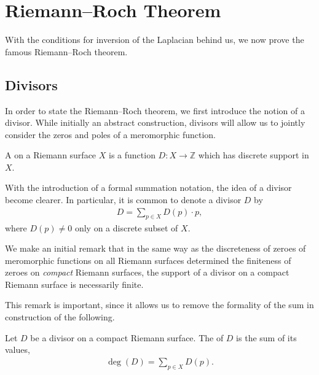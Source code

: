 \chapter{Riemann--Roch Theorem}\label{ch:riemann-roch}
\begin{chout}
	With the conditions for inversion of the Laplacian behind us, we now prove the
	famous Riemann--Roch theorem.
\end{chout}

\section{Divisors}
In order to state the Riemann--Roch theorem, we first introduce the notion of a
divisor. While initially an
abstract construction, divisors will allow us to jointly consider the zeros and
poles of a meromorphic function.

\begin{definition}[Divisor]
	A  on a Riemann surface $ X $ is a function $ D:X \to
		\mathbb{Z} $ which has discrete support in $ X $.
\end{definition}

With the introduction of a formal summation notation, the idea of a divisor
become clearer. In particular, it is common to denote a divisor $ D $ by
\begin{align*}
	D=\sum_{p \in X}^{}{D(p) \cdot p},
\end{align*}
where $ D(p) \neq 0 $ only on a discrete subset of $ X $.

\begin{remark}
	We make an initial remark that in the same way as the discreteness of zeroes of
	meromorphic functions on all Riemann surfaces determined the finiteness of
	zeroes on \textit{compact} Riemann surfaces, the support of a divisor on a
	compact Riemann surface is necessarily finite.
\end{remark}

This remark is important, since it allows us to remove the formality of the sum
in construction of the following.

\begin{definition}[Degree]
	Let $ D $ be a divisor on a compact Riemann surface. The  of
	$ D $ is the sum of its values,
	\begin{align*}
		\deg(D) = \sum_{p \in X}^{}{D(p)}.
	\end{align*}
\end{definition}

